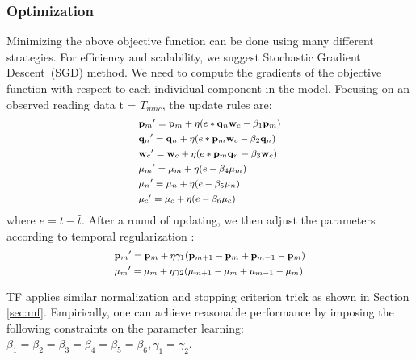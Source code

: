 \subsubsection{Optimization}
Minimizing the above objective function can be done using many different strategies.
For efficiency and scalability, we suggest Stochastic Gradient Descent~(SGD) method.
We need to compute the gradients of the objective function with respect to each individual component in the model.
Focusing on an observed reading data t = $T_{mnc} $, the update rules are:
\begin{equation*}
\small
\begin{aligned}
&{\mathbf{p}_m}^\prime={\mathbf{p}_m}+\eta(e*\mathbf{q}_n \mathbf{w}_c - \beta_1 \mathbf{p}_m)
\\&{\mathbf{q}_n}^\prime={\mathbf{q}_n}+\eta(e*\mathbf{p}_m \mathbf{w}_c - \beta_2 \mathbf{q}_n)
\\&{\mathbf{w}_c}^\prime={\mathbf{w}_c}+\eta(e*\mathbf{p}_m \mathbf{q}_n - \beta_3 \mathbf{w}_c)
\\&{\mu_m}^\prime=\mu_m+\eta(e-\beta_4\mu_m)
\\&{\mu_n}^\prime=\mu_n+\eta(e-\beta_5\mu_n)
\\&{\mu_c}^\prime=\mu_c+\eta(e-\beta_6\mu_c)
\end{aligned}
\end{equation*}
where $e=t-\hat{t}$. After a round of updating, we then adjust the parameters according to temporal regularization :
\begin{equation*}
\small
\begin{aligned}
&{\mathbf{p}_m}^\prime={\mathbf{p}_m}+\eta\gamma_1(\mathbf{p}_{m+1}-\mathbf{p}_m+\mathbf{p}_{m-1}-\mathbf{p}_m)
\\&{\mu_m}^\prime=\mu_m+\eta\gamma_2(\mu_{m+1}-\mu_m+\mu_{m-1}-\mu_m)
\end{aligned}
\end{equation*}

TF applies similar normalization and stopping criterion trick as shown in Section \ref{sec:mf}.
Empirically, one can achieve reasonable performance by imposing the following constraints on the parameter learning:  
$\beta_1=\beta_2=\beta_3=\beta_4=\beta_5=\beta_6, \gamma_1=\gamma_2.$
